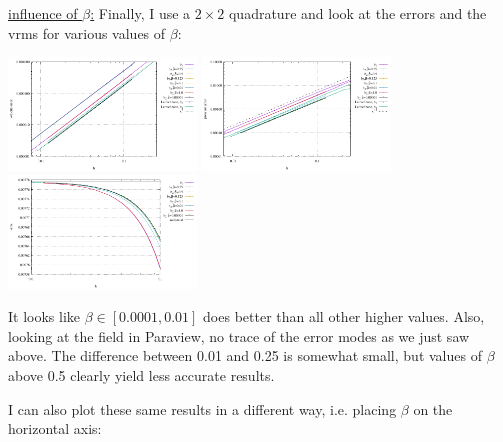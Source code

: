 \underline{influence of $\beta$:} Finally, I use a $2\times 2$ quadrature and look at 
the errors and the vrms for various values of $\beta$:
\begin{center}
\includegraphics[width=5cm]{python_codes/fieldstone_72/results/mms/errors_v_beta}
\includegraphics[width=5cm]{python_codes/fieldstone_72/results/mms/errors_p_beta}
\includegraphics[width=5cm]{python_codes/fieldstone_72/results/mms/vrms_beta}
\end{center}
It looks like $\beta\in[0.0001,0.01]$ does better than all other higher values. Also, looking at the 
field in Paraview, no trace of the error modes as we just saw above.
The difference between 0.01 and 0.25 is somewhat small, but values of $\beta$ above 0.5 
clearly yield less accurate results. 

I can also plot these same results in a different way, i.e. placing $\beta$ on the horizontal axis:

